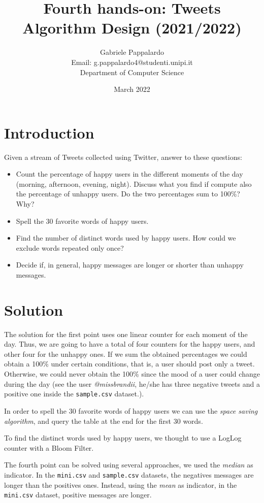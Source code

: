 \documentclass{article}
\title{Fourth hands-on: Tweets \\[1ex] \large Algorithm Design (2021/2022)}
\author{Gabriele Pappalardo\\Email: g.pappalardo4@studenti.unipi.it\\Department of Computer Science}
\date{March 2022}
\begin{document}
\maketitle

\section{Introduction}

Given a stream of Tweets collected using Twitter, answer to these questions:
\begin{itemize}
    \item Count the percentage of happy users in the different moments of the day (morning, afternoon, evening, night). Discuss what you find if compute also the percentage of unhappy users. Do the two percentages sum to 100\%? Why?
    
    \item Spell the 30 favorite words of happy users.
    
    \item Find the number of distinct words used by happy users. How could we exclude words repeated only once?

    \item Decide if, in general, happy messages are longer or shorter than unhappy messages.    
\end{itemize}

\section{Solution}

The solution for the first point uses one linear counter for each moment of the day. Thus, we are going to have a total of four counters for the happy users, and other four for the unhappy ones. If we sum the obtained percentages we could obtain
a 100\% under certain conditions, that is, a user should post only a tweet. Otherwise, we could never obtain the 100\% since the mood
of a user could change during the day (see the user \textit{@missbrandii}, he/she has three negative tweets and a positive one inside the \verb+sample.csv+ dataset.). \newline

\noindent In order to spell the 30 favorite words of happy users we can use the \textit{space saving algorithm}, and query the table at the
end for the first 30 words. \newline

\noindent To find the distinct words used by happy users, we thought to use a LogLog counter with a Bloom Filter.\newline

\noindent The fourth point can be solved using several approaches, we used the \textit{median} as indicator. In the \verb+mini.csv+ and \verb+sample.csv+ datasets, the negatives messages are longer than the positives ones.
Instead, using the \textit{mean} as indicator, in the \verb+mini.csv+ dataset, positive messages are longer.
\end{document}

